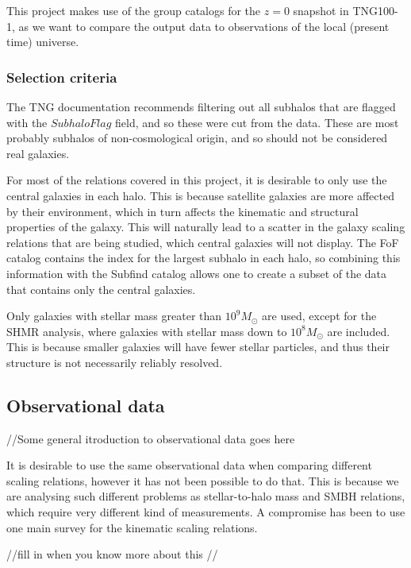 This project makes use of the group catalogs for the $z = 0$ snapshot in TNG100-1, as we want to compare the output data to observations of the local (present time) universe.

\subsubsection{Selection criteria} %

The TNG documentation recommends filtering out all subhalos that are flagged with the $SubhaloFlag$ field, and so these were cut from the data. These are most probably subhalos of non-cosmological origin, and so should not be considered real galaxies.

For most of the relations covered in this project, it is desirable to only use the central galaxies in each halo. This is because satellite galaxies are more affected by their environment, which in turn affects the kinematic and structural properties of the galaxy. This will naturally lead to a scatter in the galaxy scaling relations that are being studied, which central galaxies will not display. The FoF catalog contains the index for the largest subhalo in each halo, so combining this information with the Subfind catalog allows one to create a subset of the data that contains only the central galaxies.

Only galaxies with stellar mass greater than $10^9 M_{\odot}$ are used, except for the SHMR analysis, where galaxies with stellar mass down to $10^8 M_{\odot}$ are included. This is because smaller galaxies will have fewer stellar particles, and thus their structure is not necessarily reliably resolved.

\subsection{Observational data}
//Some general itroduction to observational data goes here

It is desirable to use the same observational data when comparing different scaling relations, however it has not been possible to do that. This is because we are analysing such different problems as stellar-to-halo mass and SMBH relations, which require very different kind of measurements. A compromise has been to use one main survey for the kinematic scaling relations. 

//fill in when you know more about this //

